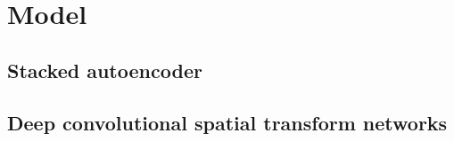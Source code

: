
\chapter{Model}

\label{ch:mode}

\section{Stacked autoencoder}

\section{Deep convolutional spatial transform networks}
